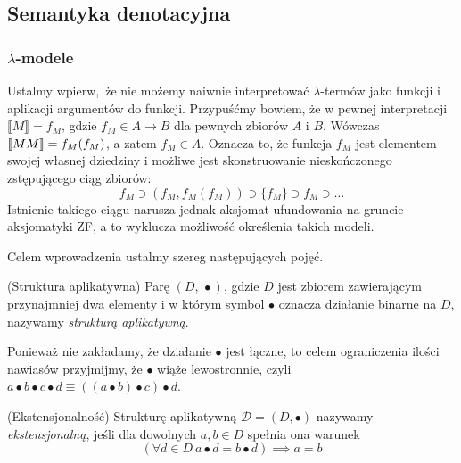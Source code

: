 \subsection{Semantyka denotacyjna}

\subsubsection{\(\lambda\)-modele}\label{subsec:lambda-models}
Ustalmy wpierw, że nie możemy naiwnie interpretować \(\lambda\)-termów jako funkcji i aplikacji argumentów do funkcji. Przypuśćmy bowiem, że w pewnej interpretacji \(\llbracket M \rrbracket=f_M\), gdzie \(f_M \in A\to B\) dla pewnych zbiorów \(A\) i \(B\). Wówczas \(\llbracket M M\rrbracket=\nobreak f_M(f_M)\), a zatem \(f_M\in A\). Oznacza to, że funkcja \(f_M\) jest elementem swojej własnej dziedziny i możliwe jest skonstruowanie nieskończonego zstępującego ciąg zbiorów:
\[
  f_M \ni \left(f_M, f_M\left(f_M\right)\right)  \ni\{f_M\} \ni f_M \ni \dots
\]
Istnienie takiego ciągu narusza jednak aksjomat ufundowania na gruncie aksjomatyki ZF, a to wyklucza możliwość określenia takich modeli.

Celem wprowadzenia ustalmy szereg następujących pojęć.

\begin{definicja}\label{def:app-structure}(Struktura aplikatywna) 
Parę \((D,\, \bullet)\), gdzie \(D\) jest zbiorem zawierającym przynajmniej dwa elementy i w którym symbol \(\bullet\) oznacza działanie binarne na \(D\), nazywamy \emph{strukturą aplikatywną}.
\end{definicja}
\begin{konwencja*}
  Ponieważ nie zakładamy, że działanie \(\bullet\) jest łączne, to celem ograniczenia ilości nawiasów przyjmijmy, że \(\bullet\) wiąże lewostronnie, czyli \(a\bullet b\bullet c\bullet d \equiv \left(\left(a\bullet b\right)\bullet c\right)\bullet d\).
\end{konwencja*}

\begin{definicja}\label{def:extens-struct}(Ekstensjonalność)
  Strukturę aplikatywną \(\mathcal{D}=(D,\bullet)\) nazywamy \emph{ekstensjonalną}, jeśli dla dowolnych \(a, b\in D\) spełnia ona warunek
  \[ (\forall d\in D\ a \bullet d = b \bullet d) \implies a = b \]
\end{definicja}

